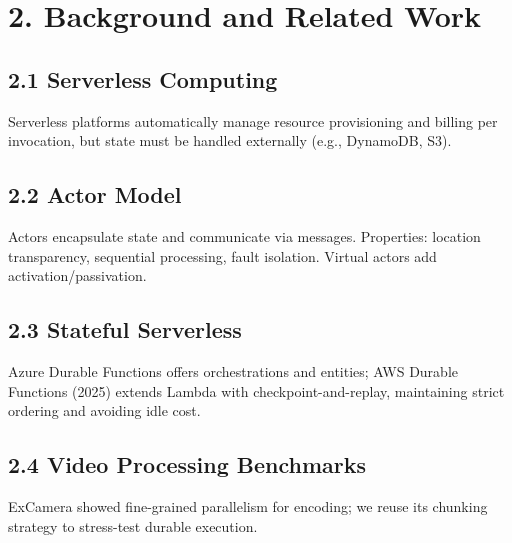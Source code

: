 \section*{2. Background and Related Work}

\subsection*{2.1 Serverless Computing}
Serverless platforms automatically manage resource provisioning and billing per invocation, but state must be handled externally (e.g., DynamoDB, S3).

\subsection*{2.2 Actor Model}
Actors encapsulate state and communicate via messages. Properties: location transparency, sequential processing, fault isolation. Virtual actors add activation/passivation.

\subsection*{2.3 Stateful Serverless}
Azure Durable Functions offers orchestrations and entities; AWS Durable Functions (2025) extends Lambda with checkpoint-and-replay, maintaining strict ordering and avoiding idle cost.

\subsection*{2.4 Video Processing Benchmarks}
ExCamera showed fine-grained parallelism for encoding; we reuse its chunking strategy to stress-test durable execution.
